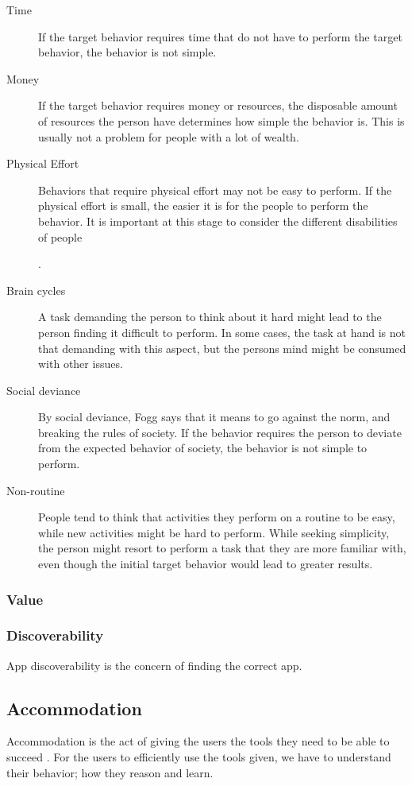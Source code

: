 \begin{description}
  \item[Time] If the target behavior requires time that do not have to perform the target behavior, the behavior is not simple.
  \item[Money] If the target behavior requires money or resources, the disposable amount of resources the person have determines how simple the behavior is. This is usually not a problem for people with a lot of wealth.
  \item[Physical Effort] Behaviors that require physical effort may not be easy to perform. If the physical effort is small, the easier it is for the people to perform the behavior. It is important at this stage to consider the different disabilities of people.
  \item[Brain cycles] A task demanding the person to think about it hard might lead to the person finding it difficult to perform. In some cases, the task at hand is not that demanding with this aspect, but the persons mind might be consumed with other issues.
  \item[Social deviance] By social deviance, Fogg says that it means to go against the norm, and breaking the rules of society. If the behavior requires the person to deviate from the expected behavior of society, the behavior is not simple to perform.
  \item[Non-routine] People tend to think that activities they perform on a routine to be easy, while new activities might be hard to perform. While seeking simplicity, the person might resort to perform a task that they are more familiar with, even though the initial target behavior would lead to greater results.
\end{description}

\subsubsection{Value}

\subsubsection{Discoverability}
App discoverability is the concern of finding the correct app. 

\subsection{Accommodation}
Accommodation is the act of giving the users the tools they need to be able to succeed \cite{Bradt2009}. For the users to efficiently use the tools given, we have to understand their behavior; how they reason and learn.

